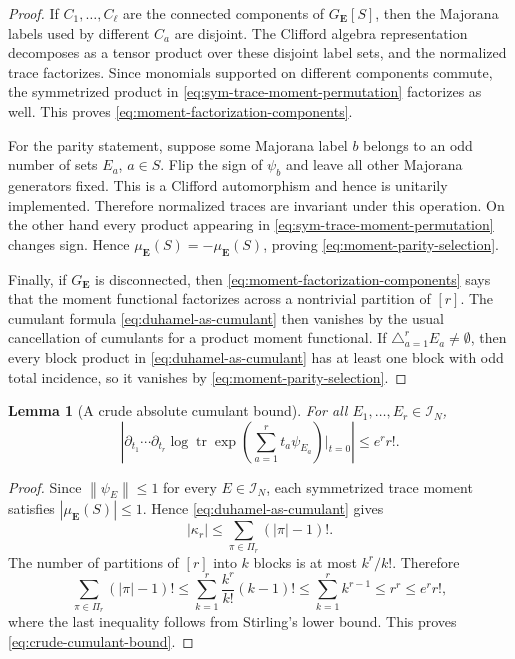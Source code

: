 \documentclass[11pt]{article}
\newtheorem{lemma}[theorem]{Lemma}
\newcommand{\tr}{\operatorname{tr}}
\newcommand{\calI}{\mathcal{I}}
\newcommand{\norm}[1]{\left\lVert #1\right\rVert}
\begin{document}
\begin{proof}
  If $C_1,\ldots,C_\ell$ are the connected components of $G_{\mathbf E}[S]$,
  then the Majorana labels used by different $C_a$ are disjoint.  The Clifford
  algebra representation decomposes as a tensor product over these disjoint
  label sets, and the normalized trace factorizes.  Since monomials supported
  on different components commute, the symmetrized product in
  \eqref{eq:sym-trace-moment-permutation} factorizes as well.  This proves
  \eqref{eq:moment-factorization-components}.

  For the parity statement, suppose some Majorana label $b$ belongs to an odd
  number of sets $E_a$, $a\in S$.  Flip the sign of $\psi_b$ and leave all other
  Majorana generators fixed.  This is a Clifford automorphism and hence is
  unitarily implemented.  Therefore normalized traces are invariant under this
  operation.  On the other hand every product appearing in
  \eqref{eq:sym-trace-moment-permutation} changes sign.  Hence
  $\mu_{\mathbf E}(S)=-\mu_{\mathbf E}(S)$, proving
  \eqref{eq:moment-parity-selection}.

  Finally, if $G_{\mathbf E}$ is disconnected, then
  \eqref{eq:moment-factorization-components} says that the moment functional
  factorizes across a nontrivial partition of $[r]$.  The cumulant formula
  \eqref{eq:duhamel-as-cumulant} then vanishes by the usual cancellation of
  cumulants for a product moment functional.  If
  $\triangle_{a=1}^rE_a\neq\emptyset$, then every block product in
  \eqref{eq:duhamel-as-cumulant} has at least one block with odd total
  incidence, so it vanishes by \eqref{eq:moment-parity-selection}.
\end{proof}

\begin{lemma}[A crude absolute cumulant bound]
  \label{lem:crude-cumulant-bound}
  For all $E_1,\ldots,E_r\in\calI_N$,
  \begin{equation}\label{eq:crude-cumulant-bound}
    \left|
      \partial_{t_1}\cdots\partial_{t_r}
      \log\tr\exp\left(\sum_{a=1}^r t_a\psi_{E_a}\right)\bigg|_{t=0}
    \right|
    \leq
    e^r r!.
  \end{equation}
\end{lemma}

\begin{proof}
  Since $\norm{\psi_E}\leq1$ for every $E\in\calI_N$, each symmetrized trace
  moment satisfies $|\mu_{\mathbf E}(S)|\leq1$.  Hence
  \eqref{eq:duhamel-as-cumulant} gives
  \begin{equation}\label{eq:cumulant-partition-sum-bound}
    |\kappa_r|
    \leq
    \sum_{\pi\in\Pi_r}(|\pi|-1)!.
  \end{equation}
  The number of partitions of $[r]$ into $k$ blocks is at most $k^r/k!$.
  Therefore
  \begin{equation}\label{eq:cumulant-partition-sum-bound-2}
    \sum_{\pi\in\Pi_r}(|\pi|-1)!
    \leq
    \sum_{k=1}^r \frac{k^r}{k!}(k-1)!
    \leq
    \sum_{k=1}^r k^{r-1}
    \leq
    r^r
    \leq
    e^r r!,
  \end{equation}
  where the last inequality follows from Stirling's lower bound.  This proves
  \eqref{eq:crude-cumulant-bound}.
\end{proof}
\end{document}
